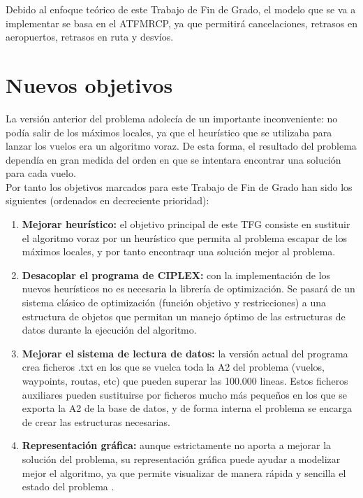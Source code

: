 Debido al enfoque teórico de este Trabajo de Fin de Grado, el modelo que se va a implementar se basa en el ATFMRCP, ya que permitirá cancelaciones, retrasos en aeropuertos, retrasos en ruta y desvíos. 

\section{Nuevos objetivos}
La versión anterior del problema adolecía de un importante inconveniente: no podía salir de los máximos locales, ya que el heurístico que se utilizaba para lanzar los vuelos era un algoritmo voraz. De esta forma, el resultado del problema dependía en gran medida del orden en que se intentara encontrar una solución para cada vuelo.\\

Por tanto los objetivos marcados para este Trabajo de Fin de Grado han sido los siguientes (ordenados en decreciente prioridad):
\begin{enumerate}
	\item \textbf{Mejorar heurístico: }el objetivo principal de este TFG consiste en sustituir el algoritmo voraz por un heurístico que permita al problema escapar de los máximos locales, y por tanto encontraqr una solución mejor al problema.
	\item \textbf{Desacoplar el programa de CIPLEX: }con la implementación de los nuevos heurísticos no es necesaria la librería de optimización. Se pasará de un sistema clásico de optimización (función objetivo y restricciones) a una estructura de objetos que permitan un manejo óptimo de las estructuras de datos durante la ejecución del algoritmo.
	\item \textbf{Mejorar el sistema de lectura de datos: }la versión actual del programa crea ficheros .txt en los que se vuelca toda la A2 del problema (vuelos, waypoints, routas, etc) que pueden superar las 100.000 lineas. Estos ficheros auxiliares pueden sustituirse por ficheros mucho más pequeños en los que se exporta la A2 de la base de datos, y de forma interna el problema se encarga de crear las estructuras necesarias.
	\item \textbf{Representación gráfica: }aunque estrictamente no aporta a mejorar la solución del problema, su representación gráfica puede ayudar a modelizar mejor el algoritmo, ya que permite visualizar de manera rápida y sencilla el estado del problema .
\end{enumerate}